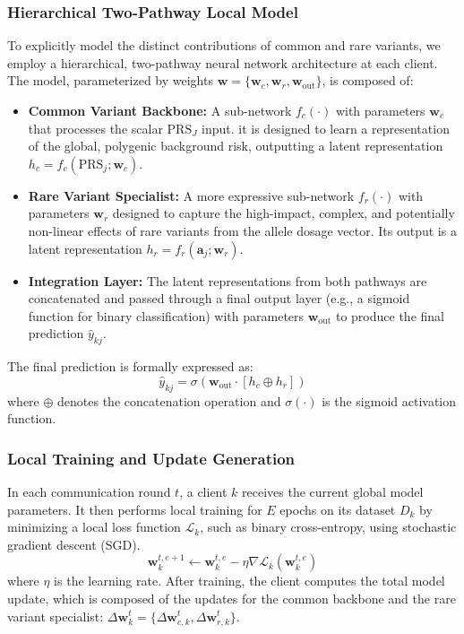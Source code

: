 \documentclass[conference]{IEEEtran}
\begin{document}
\subsubsection{Hierarchical Two-Pathway Local Model}
To explicitly model the distinct contributions of common and rare variants, we employ a hierarchical, two-pathway neural network architecture at each client. The model, parameterized by weights $\mathbf{w} = \{\mathbf{w}_c, \mathbf{w}_r, \mathbf{w}_{\text{out}}\}$, is composed of:
\begin{itemize}
  \item \textbf{Common Variant Backbone:} A sub-network $f_c(\cdot)$ with parameters $\mathbf{w}_c$ that processes the scalar $\text{PRS}_J$ input. it is designed to learn a representation of the global, polygenic background risk, outputting  a latent representation $h_c = f_c(\text{PRS}_j; \mathbf{w}_c)$.
    \item \textbf{Rare Variant Specialist:} A more expressive sub-network $f_r(\cdot)$ with parameters $\mathbf{w}_r$ designed to capture the high-impact, complex, and potentially non-linear effects of rare variants from the allele dosage vector. Its output is a latent representation $h_r = f_r(\mathbf{a}_j; \mathbf{w}_r)$.
    \item \textbf{Integration Layer:} The latent representations from both pathways are concatenated and passed through a final output layer (e.g., a sigmoid function for binary classification) with parameters $\mathbf{w}_{\text{out}}$ to produce the final prediction $\hat{y}_{kj}$.
\end{itemize}
The final prediction is formally expressed as:
\begin{equation}
    \hat{y}_{kj} = \sigma(\mathbf{w}_{\text{out}} \cdot [h_c \oplus h_r])
\end{equation}
where $\oplus$ denotes the concatenation operation and $\sigma(\cdot)$ is the sigmoid activation function.

\subsubsection{Local Training and Update Generation}
In each communication round $t$, a client $k$ receives the current global model parameters. It then performs local training for $E$ epochs on its dataset $D_k$ by minimizing a local loss function $\mathcal{L}_k$, such as binary cross-entropy, using stochastic gradient descent (SGD).
\begin{equation}
    \mathbf{w}_{k}^{t, e+1} \leftarrow \mathbf{w}_{k}^{t, e} - \eta \nabla \mathcal{L}_k(\mathbf{w}_{k}^{t, e})
\end{equation}
where $\eta$ is the learning rate. After training, the client computes the total model update, which is composed of the updates for the common backbone and the rare variant specialist: $\Delta\mathbf{w}_k^t = \{\Delta\mathbf{w}_{c,k}^t, \Delta\mathbf{w}_{r,k}^t\}$.
\end{document}

